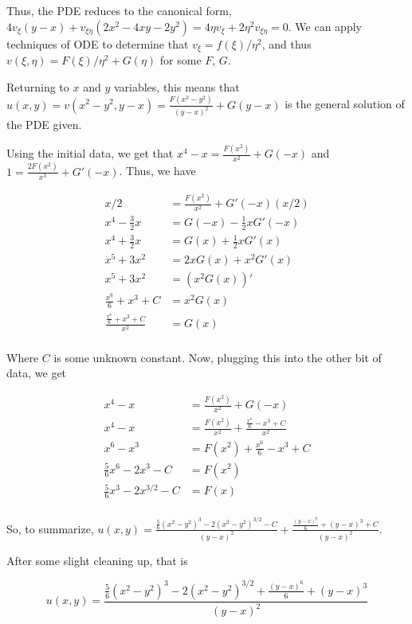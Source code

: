 \documentclass[a4paper,12pt]{article}
\begin{document}
Thus, the PDE reduces to the canonical form, $4v_\xi (y-x) + v_{\xi \eta} (2x^2-4xy-2y^2) =4\eta v_\xi + 2\eta^2 v_{\xi \eta}= 0$. We can apply techniques of ODE to determine that $v_\xi = f(\xi)/\eta^2$, and thus $v(\xi,\eta) = F(\xi)/\eta^2 + G(\eta)$ for some $F$, $G$.

Returning to $x$ and $y$ variables, this means that $u(x,y) = v(x^2-y^2,y-x) = \frac{F(x^2-y^2)}{(y-x)^2} + G(y-x)$ is the general solution of the PDE given.

Using the initial data, we get that $x^4-x = \frac{F(x^2)}{x^2} + G(-x)$ and $1=\frac{2F(x^2)}{x^3} + G'(-x)$. Thus, we have

\begin{align*}
x/2&=\frac{F(x^2)}{x^2} + G'(-x)(x/2)\\
x^4-\frac{3}{2}x &= G(-x) - \frac{1}{2}xG'(-x)\\
x^4+\frac{3}{2}x &= G(x) + \frac{1}{2}xG'(x)\\
x^5+3x^2 &= 2xG(x) + x^2G'(x)\\
x^5+3x^2 &= (x^2G(x))'\\
\frac{x^6}{6}+x^3+C &= x^2G(x)\\
\frac{\frac{x^6}{6}+x^3+C}{x^2} &= G(x)\\
\end{align*}

Where $C$ is some unknown constant. Now, plugging this into the other bit of data, we get

\begin{align*}
x^4-x &= \frac{F(x^2)}{x^2}+ G(-x)\\
x^4-x &= \frac{F(x^2)}{x^2}+ \frac{\frac{x^6}{6}-x^3+C}{x^2}\\
x^6-x^3 &= F(x^2)+ \frac{x^6}{6}-x^3+C\\
\frac{5}{6}x^6-2x^3 -C&= F(x^2)\\
\frac{5}{6}x^3-2x^{3/2} -C&= F(x)\\
\end{align*}

So, to summarize, $u(x,y) = \frac{\frac{5}{6}(x^2-y^2)^3-2(x^2-y^2)^{3/2} -C}{(y-x)^2} + \frac{\frac{(y-x)^6}{6}+(y-x)^3+C}{(y-x)^2}$.

After some slight cleaning up, that is

\begin{displaymath}
u(x,y) = \frac{\frac{5}{6}(x^2-y^2)^3-2(x^2-y^2)^{3/2} +\frac{(y-x)^6}{6}+(y-x)^3}{(y-x)^2}
\end{displaymath}

\shunt
\end{document}
